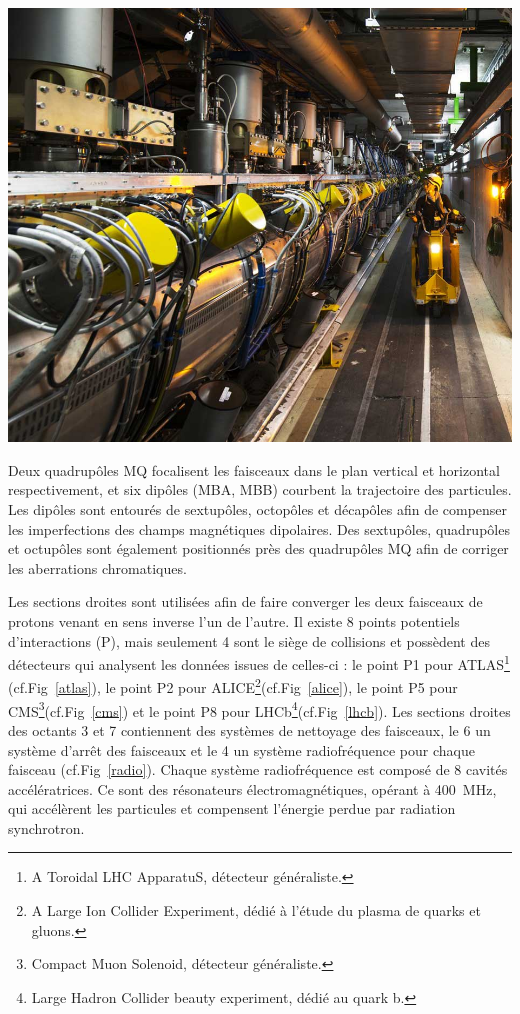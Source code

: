 \marginpar
{
	\includegraphics[width=\marginparwidth]{LHC/RF.jpg}
	\label{radio}
}

Deux quadrupôles MQ focalisent les faisceaux dans le plan vertical et horizontal respectivement, et six dipôles (MBA, MBB) courbent la trajectoire des particules. Les dipôles sont entourés de sextupôles, octopôles et décapôles afin de compenser les imperfections des champs magnétiques dipolaires. Des sextupôles, quadrupôles et octupôles sont également positionnés près des quadrupôles MQ afin de corriger les aberrations chromatiques.

Les sections droites sont utilisées afin de faire converger les deux faisceaux de protons venant en sens inverse l'un de l'autre. Il existe \num{8} points potentiels d'interactions (P), mais seulement \num{4} sont le siège de collisions et possèdent des détecteurs qui analysent les données issues de celles-ci : le point P1 pour ATLAS\footnote{A Toroidal LHC ApparatuS, détecteur généraliste.} (cf.Fig~\ref{atlas}), le point P2 pour ALICE\footnote{A Large Ion Collider Experiment, dédié à l'étude du plasma de quarks et gluons.}(cf.Fig~\ref{alice}), le point P5 pour CMS\footnote{Compact Muon Solenoid, détecteur généraliste.}(cf.Fig~\ref{cms}) et le point P8 pour LHCb\footnote{Large Hadron Collider beauty experiment, dédié au quark b.}(cf.Fig~\ref{lhcb}). Les sections droites des octants \num{3} et \num{7} contiennent des systèmes de nettoyage des faisceaux, le \num{6} un système d'arrêt des faisceaux et le \num{4} un système radiofréquence pour chaque faisceau (cf.Fig~\ref{radio}). Chaque système radiofréquence est composé de \num{8} cavités accélératrices. Ce sont des résonateurs électromagnétiques, opérant à \SI{400}{\mega\hertz}, qui accélèrent les particules et compensent l'énergie perdue par radiation synchrotron.

